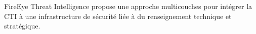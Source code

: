 FireEye Threat Intelligence propose une approche multicouches pour intégrer la CTI à une infrastructure de sécurité liée à du renseignement technique et stratégique.